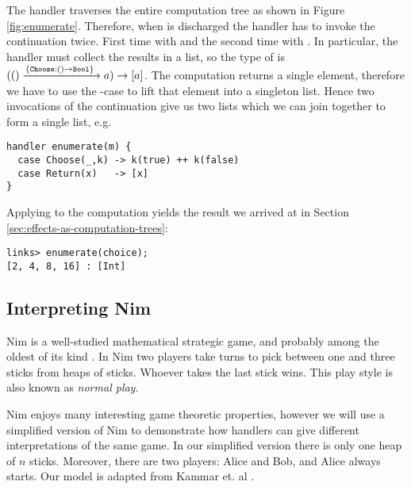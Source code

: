 \begin{example}\label{ex:enumerate}
The handler  traverses the entire computation tree as shown in Figure \ref{fig:enumerate}. Therefore, when  is discharged the handler has to invoke the continuation twice. First time with  and the second time with . In particular, the handler must collect the results in a list, so the type of  is 
$(() \xrightarrow{\{\texttt{Choose}:() \to \texttt{Bool}\}\;} a) \to [a]$.
The computation returns a single element, therefore we have to use the -case to lift that element into a singleton list. Hence two invocations of the continuation give us two lists which we can join together to form a single list, e.g.
\begin{lstlisting}[style=links]
handler enumerate(m) {
  case Choose(_,k) -> k(true) ++ k(false)
  case Return(x)   -> [x]
}
\end{lstlisting}
Applying  to the computation  yields the result we arrived at in Section \ref{sec:effects-as-computation-trees}:
\begin{lstlisting}[style=links]
links> enumerate(choice);
[2, 4, 8, 16] : [Int]
\end{lstlisting}
\end{example}

\subsection{Interpreting Nim}\label{sec:interpreting-nim}
Nim is a well-studied mathematical strategic game, and probably among the oldest of its kind \cite{Joergensen2009}. In Nim two players take turns to pick between one and three sticks from heaps of sticks. Whoever takes the last stick wins. This play style is also known as \emph{normal play}. 

Nim enjoys many interesting game theoretic properties, however we will use a simplified version of Nim to demonstrate how handlers can give different interpretations of the same game. In our simplified version there is only one heap of $n$ sticks. Moreover, there are two players: Alice and Bob, and Alice always starts. Our model is adapted from Kammar et. al \cite{Kammar2013}.

